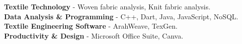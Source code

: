 
  \vspace{2mm}
  
  \textbf{Textile Technology} - Woven fabric analysis, Knit fabric analysis. \\
   \vspace{1mm}
  \textbf{Data Analysis \& Programming} - C++, Dart, Java, JavaScript, NoSQL. \\
   \vspace{1mm}
  \textbf{Textile Engineering Software} - ArahWeave, TexGen. \\
   \vspace{1mm}
  \textbf{Productivity \& Design} - Microsoft Office Suite, Canva. 
  
\vspace{5mm}
